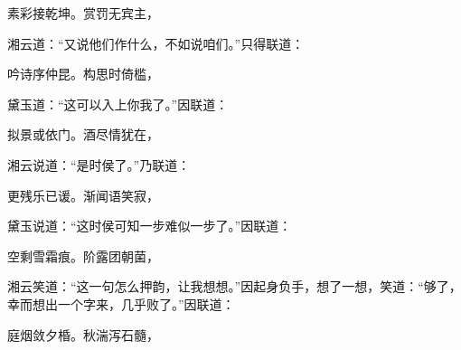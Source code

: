 \begin{poem}
    \begin{pl}
        素彩接乾坤。赏罚无宾主，
    \end{pl}
\end{poem}


\begin{parag}
    湘云道：“又说他们作什么，不如说咱们。”只得联道：
\end{parag}


\begin{poem}
    \begin{pl}
        吟诗序仲昆。构思时倚槛，
    \end{pl}
\end{poem}


\begin{parag}
    黛玉道：“这可以入上你我了。”因联道：
\end{parag}


\begin{poem}
    \begin{pl}
        拟景或依门。酒尽情犹在，
    \end{pl}
\end{poem}


\begin{parag}
    湘云说道：“是时侯了。”乃联道：
\end{parag}


\begin{poem}
    \begin{pl}
        更残乐已谖。渐闻语笑寂，
    \end{pl}
\end{poem}


\begin{parag}
    黛玉说道：“这时侯可知一步难似一步了。”因联道：
\end{parag}


\begin{poem}
    \begin{pl}
        空剩雪霜痕。阶露团朝菌，
    \end{pl}
\end{poem}


\begin{parag}
    湘云笑道：“这一句怎么押韵，让我想想。”因起身负手，想了一想，笑道：“够了，幸而想出一个字来，几乎败了。”因联道：
\end{parag}


\begin{poem}
    \begin{pl}

        庭烟敛夕棔。秋湍泻石髓，
    \end{pl}
\end{poem}


